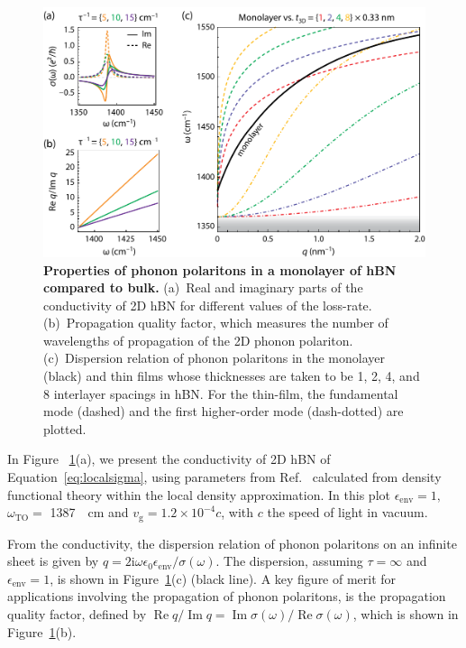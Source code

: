 \documentclass[aps,prb,twocolumn,
	           groupedaddress,superscriptaddress,
               amsfonts,amssymb,amsmath,floatfix,
	           citeautoscript]{revtex4-1}
\renewcommand{\Im}{\operatorname{Im}}
\renewcommand{\Re}{\operatorname{Re}}
\newcommand{\iu}{\mathrm{i}}
\begin{document}
\begin{figure}[t]
    \includegraphics[width=.7\linewidth]{figure2hBN.pdf}
    \caption{%
        \textbf{Properties of phonon polaritons in a monolayer of hBN compared to bulk.} (a)~Real and imaginary parts of the conductivity of 2D hBN for different values of the loss-rate. (b)~Propagation quality factor, which measures the number of wavelengths of propagation of the 2D phonon polariton. (c)~Dispersion relation of phonon polaritons in the monolayer (black) and thin films whose thicknesses are taken to be 1, 2, 4, and 8 interlayer spacings in hBN. For the thin-film, the fundamental mode (dashed) and the first higher-order mode (dash-dotted) are plotted. 
        \label{fig:2}
        }
\end{figure}



In Figure ~\ref{fig:2}(a), we present the conductivity of 2D hBN of Equation~\ref{eq:localsigma}, using parameters from Ref.~ calculated from density functional theory within the local density approximation. In this plot $\epsilon_{\mathrm{env}}=1,$ $\omega_{\mathrm{TO}} = $ \SI{1387}{\per\cm} and $v_{\mathrm{g}} = 1.2\times 10^{-4}c$, with $c$ the speed of light in vacuum.

From the conductivity, the dispersion relation of phonon polaritons on an infinite sheet is given by $q={2\iu\omega\epsilon_0\epsilon_{\mathrm{env}}}/{\sigma(\omega)}$. The dispersion, assuming $\tau = \infty$ and $\epsilon_{\mathrm{env}}=1$, is shown in Figure~\ref{fig:2}(c) (black line). A key figure of merit for applications involving the propagation of phonon polaritons, is the propagation quality factor, defined by ${\Re q}/{\Im q} = {\Im\sigma(\omega)}/{\Re\sigma(\omega)}$, which is shown in Figure~\ref{fig:2}(b).
\end{document}
